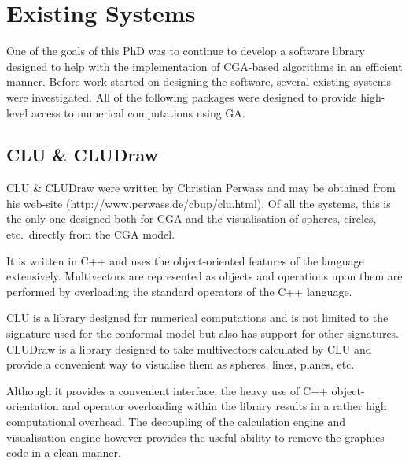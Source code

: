 
\section{Existing Systems}

One of the goals of this PhD was to continue to develop a software
library designed to help with the implementation of CGA-based algorithms
in an efficient manner. Before work started on designing 
the software, several existing systems 
were investigated. All of the following packages were designed to
provide high-level access to numerical computations using GA.

\subsection{CLU \& CLUDraw}

CLU \& CLUDraw were written by Christian Perwass and may be obtained from his
web-site (http://www.perwass.de/cbup/clu.html). Of all the systems, this
is the only one designed both for CGA and the visualisation of spheres,
circles, etc.\ directly from the CGA model.

It is written in C++ and uses the object-oriented features of the language
extensively. Multivectors are represented as objects and operations upon
them are performed by overloading the standard operators of the C++
language. 

CLU is a library designed for numerical computations and is not limited
to the signature used for the conformal model but also has support for
other signatures. CLUDraw is a library designed to take multivectors calculated
by CLU and provide a convenient way to visualise them as spheres, lines, planes,
etc. 

Although it provides a convenient interface, the heavy use of C++ object-orientation
and operator overloading within the library results in a rather high
computational overhead. The decoupling of the calculation engine and
visualisation engine however provides the useful ability to remove the
graphics code in a clean manner.

